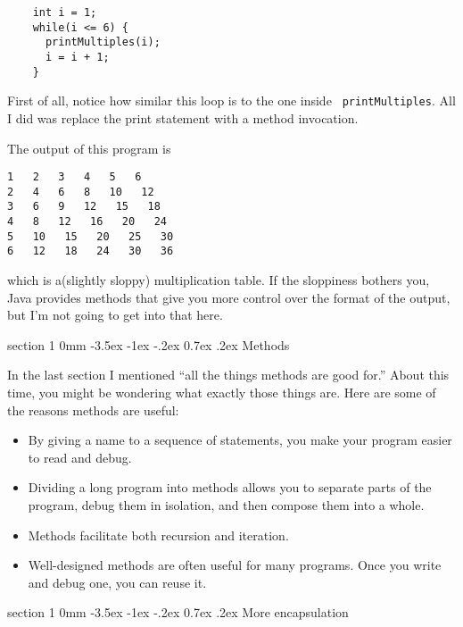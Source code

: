 \documentclass{book}
\makeatletter
\renewcommand{\section}{\@startsection 
    {section} {1} {0mm}%
    {-3.5ex \@plus -1ex \@minus -.2ex}%
    {0.7ex \@plus.2ex}%
    {\normalfont\Large\bfseries}}
\makeatother
\begin{document}
\begin{verbatim}
    int i = 1;
    while(i <= 6) {
      printMultiples(i);
      i = i + 1;
    }    
\end{verbatim}
%
First of all, notice how similar this loop is to the one inside {\tt
printMultiples}.  All I did was replace the print statement with a
method invocation.

The output of this program is

\begin{verbatim}
1   2   3   4   5   6   
2   4   6   8   10   12   
3   6   9   12   15   18   
4   8   12   16   20   24   
5   10   15   20   25   30   
6   12   18   24   30   36   
\end{verbatim}
%
which is a(slightly sloppy) multiplication table.  If the
sloppiness bothers you, Java provides methods that give you
more control over the format of the output, but I'm not
going to get into that here.

\section{Methods}

In the last section I mentioned ``all the things methods
are good for.''  About this time, you might be wondering
what exactly those things are.  Here are some of the reasons
methods are useful:

\begin{itemize}

\item By giving a name to a sequence of statements, you make
your program easier to read and debug.

\item Dividing a long program into methods allows you to
separate parts of the program, debug them in isolation, and
then compose them into a whole.

\item Methods facilitate both recursion and iteration.

\item Well-designed methods are often useful for many programs.
Once you write and debug one, you can reuse it.

\end{itemize}

\section{More encapsulation}
\end{document}
